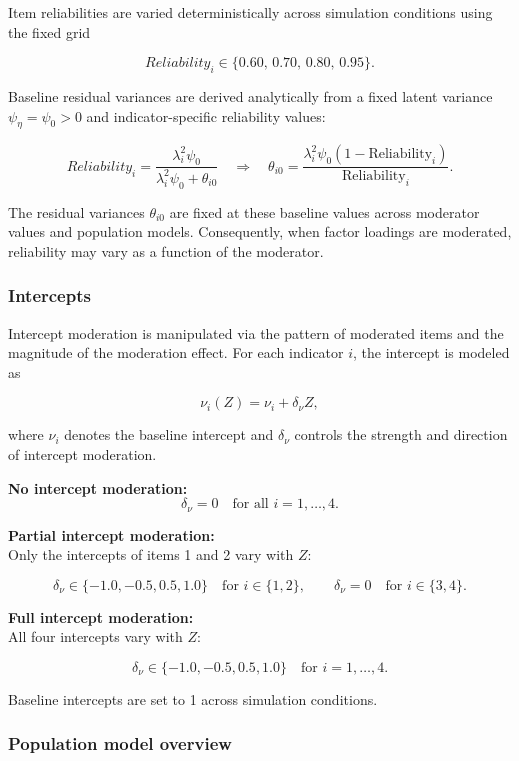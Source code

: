 \documentclass[
  man,
  floatsintext]{apa7}
\begin{document}
Item reliabilities are varied deterministically across simulation
conditions using the fixed grid

\[
Reliability_i \in \{0.60,\,0.70,\,0.80,\,0.95\}.
\]

Baseline residual variances are derived analytically from a fixed latent
variance \(\psi_\eta=\psi_0>0\) and indicator-specific reliability
values:

\[
Reliability_i=\frac{\lambda_i^2 \psi_0}{\lambda_i^2 \psi_0 + \theta_{i0}}
\quad \Rightarrow \quad
\theta_{i0}=
\frac{\lambda_i^2 \psi_0(1-\text{Reliability}_i)}
{\text{Reliability}_i}.
\]

The residual variances \(\theta_{i0}\) are fixed at these baseline
values across moderator values and population models. Consequently, when
factor loadings are moderated, reliability may vary as a function of the
moderator.

\subsubsection{Intercepts}\label{intercepts}

Intercept moderation is manipulated via the pattern of moderated items
and the magnitude of the moderation effect. For each indicator \(i\),
the intercept is modeled as

\[
\nu_i(Z) = \nu_i + \delta_{\nu} Z,
\]

where \(\nu_i\) denotes the baseline intercept and \(\delta_{\nu}\)
controls the strength and direction of intercept moderation.

\textbf{No intercept moderation:}\\
\[
\delta_{\nu}=0 \quad \text{for all } i=1,\dots,4.
\]

\textbf{Partial intercept moderation:}\\
Only the intercepts of items 1 and 2 vary with \(Z\):

\[
\delta_{\nu} \in \{-1.0,-0.5,0.5,1.0\}
\quad \text{for } i \in \{1,2\},
\qquad
\delta_{\nu}=0
\quad \text{for } i \in \{3,4\}.
\]

\textbf{Full intercept moderation:}\\
All four intercepts vary with \(Z\):

\[
\delta_{\nu} \in \{-1.0,-0.5,0.5,1.0\}
\quad \text{for } i=1,\dots,4.
\]

Baseline intercepts are set to 1 across simulation conditions.

\newpage

\subsubsection{Population model
overview}\label{population-model-overview}
\end{document}
